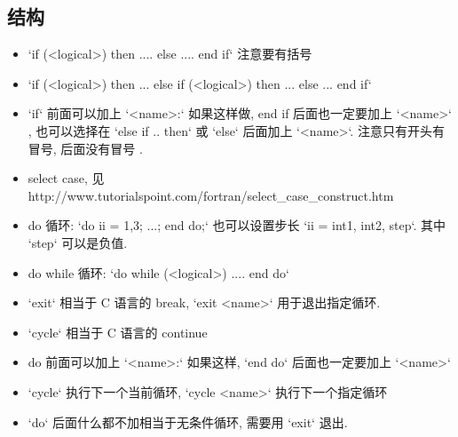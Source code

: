 \subsection{结构}
\begin{itemize}
\item `if (<logical>) then ....  else .... end if` 注意要有括号
\item `if (<logical>) then ... else if (<logical>) then ... else ... end if`
\item `if` 前面可以加上 `<name>:` 如果这样做,  end if 后面也一定要加上 `<name>`  , 也可以选择在 `else if .. then` 或 `else` 后面加上 `<name>`. 注意只有开头有冒号, 后面没有冒号 .
\item select case, 见 http://www.tutorialspoint.com/fortran/select_case_construct.htm
\item do 循环:   `do ii = 1,3; ...; end do;` 也可以设置步长 `ii = int1, int2, step`. 其中 `step` 可以是负值.
\item do while 循环: `do while (<logical>) ....  end do`
\item `exit` 相当于 C 语言的 break, `exit <name>` 用于退出指定循环.
\item `cycle` 相当于 C 语言的 continue
\item do 前面可以加上 `<name>:` 如果这样, `end do` 后面也一定要加上 `<name>`
\item `cycle` 执行下一个当前循环, `cycle <name>` 执行下一个指定循环
\item `do` 后面什么都不加相当于无条件循环, 需要用 `exit` 退出.
\end{itemize}
